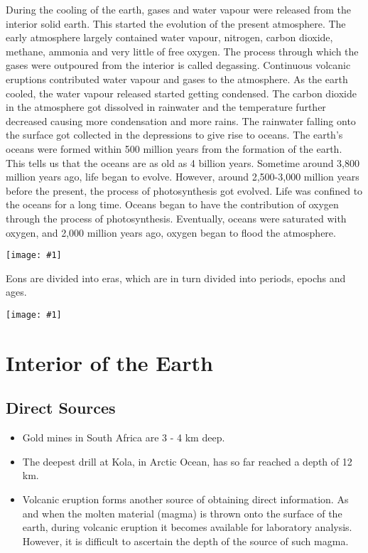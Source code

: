 \documentclass[8pt, a4paper, oneside, twocolumn]{extarticle}
\newcommand{\ph}[1]{
    \texttt{[image: \#1]}
}
\begin{document}
During the cooling of the earth, gases and water vapour were released from the interior solid earth. This started the evolution of the present atmosphere. The early atmosphere largely contained water vapour, nitrogen, carbon dioxide, methane, ammonia and very little of free oxygen. The process through which the gases were outpoured from the interior is called degassing. Continuous volcanic eruptions contributed water vapour and gases to the atmosphere. As the earth cooled, the water vapour released started getting condensed. The carbon dioxide in the atmosphere got dissolved in rainwater and the temperature further decreased causing more condensation and more rains. The rainwater falling onto the surface got collected in the depressions to give rise to oceans. The earth’s oceans were formed within 500 million years from the formation of the earth. This tells us that the oceans are as old as 4 billion years. Sometime around 3,800 million years ago, life began to evolve. However, around 2,500-3,000 million years before the present, the process of photosynthesis got evolved. Life was confined to the oceans for a long time. Oceans began to have the contribution of oxygen through the process of photosynthesis. Eventually, oceans were saturated with oxygen, and 2,000 million years ago, oxygen began to flood the atmosphere.

\ph{gts}

Eons are divided into eras, which are in turn divided into periods, epochs and ages.

\ph{ss2}

\section{Interior of the Earth}

\subsection{Direct Sources}
\begin{itemize}
  \item Gold mines in South Africa are 3 - 4 km deep.
  \item  The deepest drill at Kola, in Arctic Ocean, has so far reached a depth of 12 km.
  \item Volcanic eruption forms another source of obtaining direct information. As and when the molten material (magma) is thrown onto the surface of the earth, during volcanic eruption it becomes available for laboratory analysis. However, it is difficult to ascertain the depth of the source of such magma.
\end{itemize}
\end{document}
